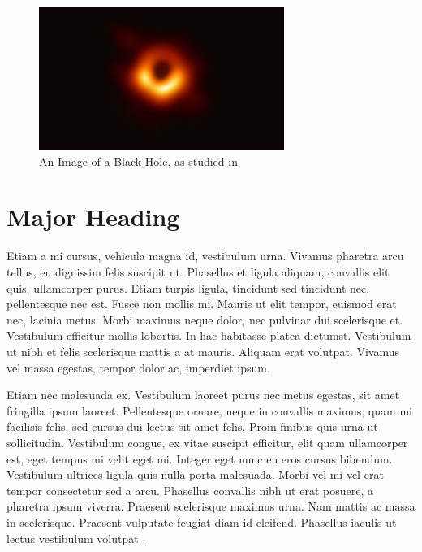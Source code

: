 \begin{figure}[ht]
\centering
\includegraphics[width=8cm]{Imgs/Black Hole Image.jpg}
\caption{An Image of a Black Hole, as studied in \textcite{hawking_particle_1993}}
\end{figure}

\section{Major Heading}
Etiam a mi cursus, vehicula magna id, vestibulum urna. Vivamus pharetra arcu tellus, eu dignissim felis suscipit ut. Phasellus et ligula aliquam, convallis elit quis, ullamcorper purus. Etiam turpis ligula, tincidunt sed tincidunt nec, pellentesque nec est. Fusce non mollis mi. Mauris ut elit tempor, euismod erat nec, lacinia metus. Morbi maximus neque dolor, nec pulvinar dui scelerisque et. Vestibulum efficitur mollis lobortis. In hac habitasse platea dictumst. Vestibulum ut nibh et felis scelerisque mattis a at mauris. Aliquam erat volutpat. Vivamus vel massa egestas, tempor dolor ac, imperdiet ipsum.

Etiam nec malesuada ex. Vestibulum laoreet purus nec metus egestas, sit amet fringilla ipsum laoreet. Pellentesque ornare, neque in convallis maximus, quam mi facilisis felis, sed cursus dui lectus sit amet felis. Proin finibus quis urna ut sollicitudin. Vestibulum congue, ex vitae suscipit efficitur, elit quam ullamcorper est, eget tempus mi velit eget mi. Integer eget nunc eu eros cursus bibendum. Vestibulum ultrices ligula quis nulla porta malesuada. Morbi vel mi vel erat tempor consectetur sed a arcu. Phasellus convallis nibh ut erat posuere, a pharetra ipsum viverra. Praesent scelerisque maximus urna. Nam mattis ac massa in scelerisque. Praesent vulputate feugiat diam id eleifend. Phasellus iaculis ut lectus vestibulum volutpat \autocite{amjad_value_2020}.
